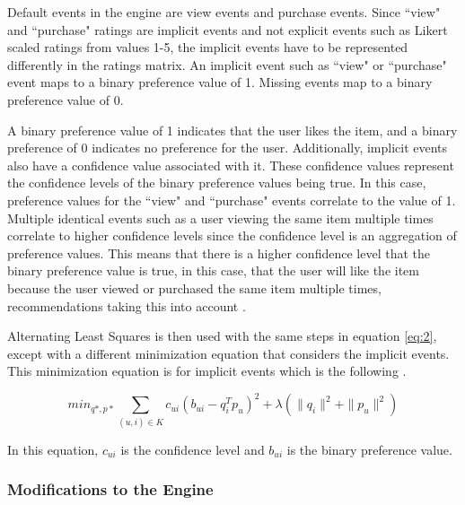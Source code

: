 Default events in the engine are view events and purchase events.
Since ``view" and ``purchase" ratings are implicit events and not explicit events such as Likert scaled ratings from values 1-5, the implicit events have to be represented differently in the ratings matrix. An implicit event such as ``view" or ``purchase" event maps to a binary preference value of 1. Missing events map to a binary preference value of 0. 

A binary preference value of 1 indicates that the user likes the item, and a binary preference of 0 indicates no preference for the user. Additionally, implicit events also have a confidence value associated with it. These confidence values represent the confidence levels of the binary preference values being true. In this case, preference values for the ``view" and ``purchase" events correlate to the value of 1. Multiple identical events such as a user viewing the same item multiple times correlate to higher confidence levels since the confidence level is an aggregation of preference values. This means that there is a higher confidence level that the binary preference value is true, in this case, that the user will like the item because the user viewed or purchased the same item multiple times, recommendations taking this into account . 


Alternating Least Squares is then used with the same steps in equation \ref{eq:2}, except with a different minimization equation that considers the implicit events. This minimization equation is for implicit events which is the following \cite{implicit}.

\begin{equation}\label{eq:3}\tag{3}
\displaystyle min_{q*,p*} \sum_{ (u,i) \in K} c_{ui}(b_{ui} - q_{i}^T p_{u})^2 + \lambda (\| q_{i} \|^2 + \| p_{u} \|^2 )
\end{equation}

In this equation, \begin{math} c_{ui} \end{math} is the confidence level and \begin{math} b_{ui} \end{math} is the binary preference value. 

\subsubsection{Modifications to the Engine}

